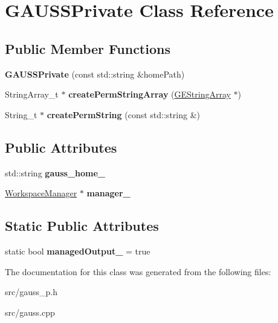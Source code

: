 \hypertarget{class_g_a_u_s_s_private}{}\section{G\+A\+U\+S\+S\+Private Class Reference}
\label{class_g_a_u_s_s_private}
\subsection*{Public Member Functions}
\begin{DoxyCompactItemize}
\item 
\mbox{\label{class_g_a_u_s_s_private_a8c264b7a93edce217624ac9c04cd4a2e}} 
{\bfseries G\+A\+U\+S\+S\+Private} (const std\+::string \&home\+Path)
\item 
\mbox{\label{class_g_a_u_s_s_private_ab15fc67f25925a0cf4db90a53e43a9d7}} 
String\+Array\+\_\+t $\ast$ {\bfseries create\+Perm\+String\+Array} (\hyperlink{class_g_e_string_array}{G\+E\+String\+Array} $\ast$)
\item 
\mbox{\label{class_g_a_u_s_s_private_a5a458aaff0286a0ef298dc0a2cc5ff4b}} 
String\+\_\+t $\ast$ {\bfseries create\+Perm\+String} (const std\+::string \&)
\end{DoxyCompactItemize}
\subsection*{Public Attributes}
\begin{DoxyCompactItemize}
\item 
\mbox{\label{class_g_a_u_s_s_private_a679967c9cf82d210bbd1a9175fabbf39}} 
std\+::string {\bfseries gauss\+\_\+home\+\_\+}
\item 
\mbox{\label{class_g_a_u_s_s_private_a958b83efb05a1823eeb4e5f577767131}} 
\hyperlink{class_workspace_manager}{Workspace\+Manager} $\ast$ {\bfseries manager\+\_\+}
\end{DoxyCompactItemize}
\subsection*{Static Public Attributes}
\begin{DoxyCompactItemize}
\item 
\mbox{\label{class_g_a_u_s_s_private_aa4f61f8c75eddfacb6a12cc77ac1c502}} 
static bool {\bfseries managed\+Output\+\_\+} = true
\end{DoxyCompactItemize}


The documentation for this class was generated from the following files\+:\begin{DoxyCompactItemize}
\item 
src/gauss\+\_\+p.\+h\item 
src/gauss.\+cpp\end{DoxyCompactItemize}
